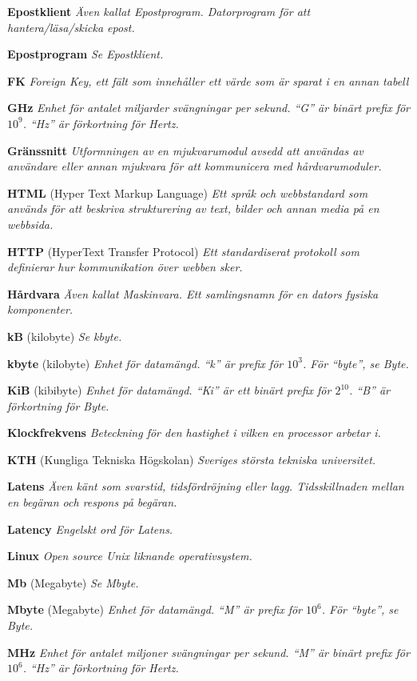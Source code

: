 \documentclass[a4paper, twoside, 11pt, titlepage]{article}
\begin{document}
	\textbf{Epostklient} \emph{Även kallat Epostprogram. Datorprogram för att hantera/läsa/skicka epost.}

	\textbf{Epostprogram} \emph{Se Epostklient.}

	\textbf{FK} \emph{Foreign Key, ett fält som innehåller ett värde som är sparat i en annan tabell}

	\textbf{GHz} \emph{Enhet för antalet miljarder svängningar per sekund. ``G'' är binärt prefix för $10^9$. ``Hz'' är förkortning för Hertz.}

	\textbf{Gränssnitt} \emph{Utformningen av en mjukvarumodul avsedd att användas av användare eller annan mjukvara för att kommunicera med hårdvarumoduler.}

	\textbf{HTML} (Hyper Text Markup Language) \emph{Ett språk och webbstandard som används för att beskriva strukturering av text, bilder och annan media på en webbsida.}

	\textbf{HTTP} (HyperText Transfer Protocol) \emph{Ett standardiserat protokoll som definierar hur kommunikation över webben sker.}

	\textbf{Hårdvara} \emph{Även kallat Maskinvara. Ett samlingsnamn för en dators fysiska komponenter.}

	\textbf{kB} (kilobyte) \emph{Se kbyte.}

	\textbf{kbyte} (kilobyte) \emph{Enhet för datamängd. ``k'' är prefix för $10^3$. För ``byte'', se Byte.}

	\textbf{KiB} (kibibyte) \emph{Enhet för datamängd. ``Ki'' är ett binärt prefix för $2^10$. ``B'' är förkortning för Byte.}

	\textbf{Klockfrekvens} \emph{Beteckning för den hastighet i vilken en processor arbetar i.}

	\textbf{KTH} (Kungliga Tekniska Högskolan) \emph{Sveriges största tekniska universitet.}

	\textbf{Latens} \emph{Även känt som svarstid, tidsfördröjning eller lagg. Tidsskillnaden mellan en begäran och respons på begäran.}

	\textbf{Latency} \emph{Engelskt ord för Latens.}

	\textbf{Linux} \emph{Open source Unix liknande operativsystem.}

	\textbf{Mb} (Megabyte) \emph{Se Mbyte.}

	\textbf{Mbyte} (Megabyte) \emph{Enhet för datamängd. ``M'' är prefix för $10^6$.  För ``byte'', se Byte.}

	\textbf{MHz} \emph{Enhet för antalet miljoner svängningar per sekund. ``M'' är binärt prefix för $10^6$. ``Hz'' är förkortning för Hertz.}
\end{document}
